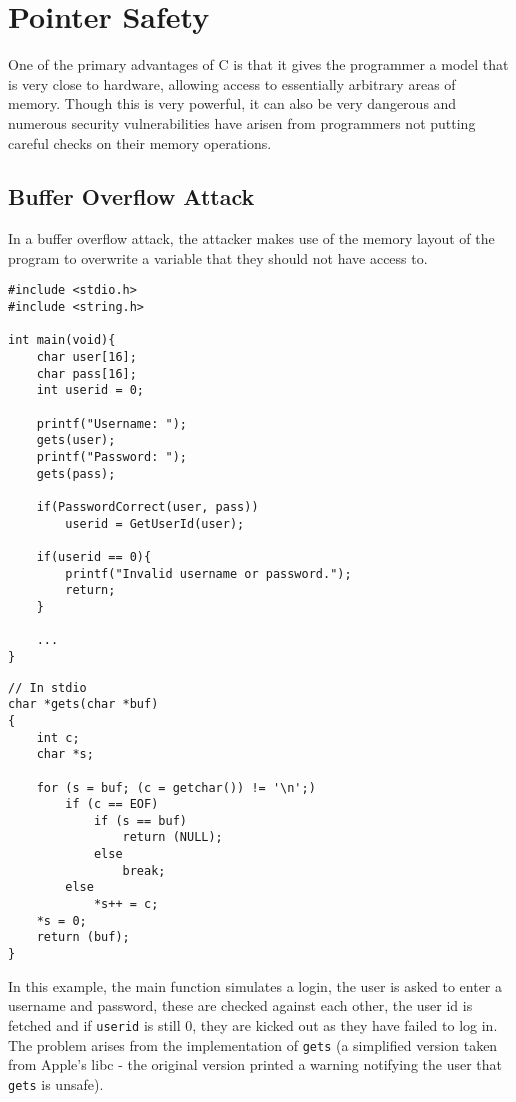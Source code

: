 \section{Pointer Safety}

One of the primary advantages of C is that it gives the programmer a model that is very close to hardware, allowing access to essentially arbitrary areas of memory.
Though this is very powerful, it can also be very dangerous and numerous security vulnerabilities have arisen from programmers not putting careful checks on their memory operations.

\subsection{Buffer Overflow Attack}

In a buffer overflow attack, the attacker makes use of the memory layout of the program to overwrite a variable that they should not have access to.

\begin{verbatim}
#include <stdio.h>
#include <string.h>

int main(void){
    char user[16];
    char pass[16];
    int userid = 0;

    printf("Username: ");
    gets(user);
    printf("Password: ");
    gets(pass);

    if(PasswordCorrect(user, pass))
        userid = GetUserId(user);

    if(userid == 0){
        printf("Invalid username or password.");
        return;
    }

    ...
}
\end{verbatim}

\begin{verbatim}
// In stdio
char *gets(char *buf)
{
    int c;
    char *s;

    for (s = buf; (c = getchar()) != '\n';)
        if (c == EOF)
            if (s == buf)
                return (NULL);
            else
                break;
        else
            *s++ = c;
    *s = 0;
    return (buf);
}
\end{verbatim}

In this example, the main function simulates a login, the user is asked to enter a username and password, these are checked against each other, the user id is fetched and if \verb!userid! is still 0, they are kicked out as they have failed to log in.
The problem arises from the implementation of \verb!gets! (a simplified version taken from Apple's libc - the original version printed a warning notifying the user that \verb!gets! is unsafe).

